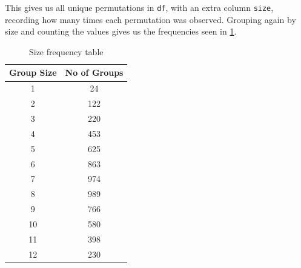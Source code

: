 \documentclass{article}
\begin{document}
This gives us all unique permutations in \texttt{df}, with an extra column \texttt{size}, recording how many times each permutation was observed. Grouping again by size and counting the values gives us the frequencies seen in \cref{tbl:frequency}.

\begin{table}[H]
    \centering
    \caption{Size frequency table}
    \label{tbl:frequency}
    \begin{tabular}{@{}cc@{}}
    \toprule
    Group Size & No of Groups \\ \midrule
    1          & 24           \\
    2          & 122          \\
    3          & 220          \\
    4          & 453          \\
    5          & 625          \\
    6          & 863          \\
    7          & 974          \\
    8          & 989          \\
    9          & 766          \\
    10         & 580          \\
    11         & 398          \\
    12         & 230          \\ \bottomrule
    \end{tabular}
\end{table}
\end{document}
